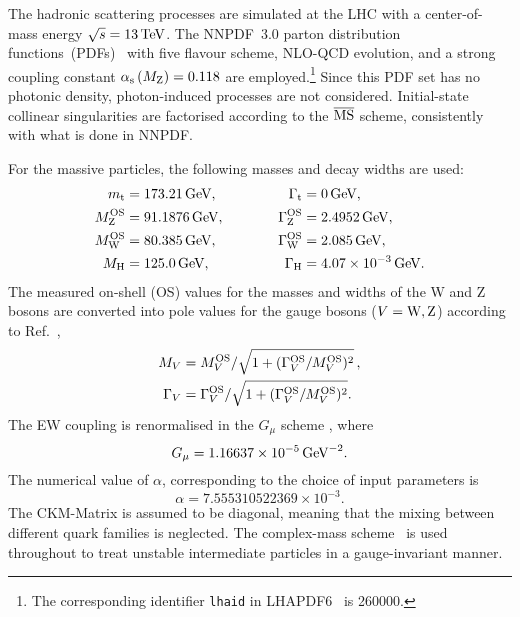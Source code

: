 The hadronic scattering processes are simulated at the LHC with a center-of-mass energy $\sqrt s = 13 \,\text{TeV}$.
The NNPDF~3.0 parton distribution functions~(PDFs)~\cite{Ball:2014uwa} with five flavour scheme, NLO-QCD evolution, and a strong coupling constant $\alpha_\text{s}\left( M_\text{Z} \right) = 0.118$ are employed.\footnote{The corresponding identifier {\tt lhaid} in LHAPDF6~\cite{Buckley:2014ana} is 260000.}
Since this PDF set has no photonic density, photon-induced processes are not considered.  
Initial-state collinear singularities are factorised according to the ${\overline{\rm MS}}$ scheme, consistently with what is done in NNPDF. 

For the massive particles, the following masses and decay widths are used:
%
\begin{alignat}{2}
                  m_\text{t}   &=  173.21\,\text{GeV},       & \quad \quad \quad \Gamma_\text{t} &= 0 \,\text{GeV},  \nonumber \\
                M_\text{Z}^\text{OS} &=  91.1876\,\text{GeV},      & \quad \quad \quad \Gamma_\text{Z}^\text{OS} &= 2.4952\,\text{GeV},  \nonumber \\
                M_\text{W}^\text{OS} &=  80.385\,\text{GeV},       & \Gamma_\text{W}^\text{OS} &= 2.085\,\text{GeV},  \nonumber \\
                M_{\rm H} &=  125.0\,\text{GeV},       &  \Gamma_\text{H}   &=  4.07 \times 10^{-3}\,\text{GeV}.
\end{alignat}
%
The measured on-shell (OS) values for the masses and widths of the W and Z bosons are converted into pole values for the gauge bosons ($V=\text{W},\text{Z}$) according to Ref.~\cite{Bardin:1988xt},
%
\begin{equation}
\begin{split}
        M_V &= M_{V}^\text{OS}/\sqrt{1+(\Gamma_{V}^\text{OS}/M_{V}^\text{OS})^2}\,, \\
   \Gamma_V &= \Gamma_{V}^\text{OS}/\sqrt{1+(\Gamma_{V}^\text{OS}/M_{V}^\text{OS})^2}.
\end{split}
\end{equation}
%
The EW coupling is renormalised in the $G_\mu$ scheme \cite{Denner:2000bj}, where
%
\begin{equation}
    G_{\mu}    = 1.16637\times 10^{-5}\,\text{GeV}^{-2}.
\end{equation}
%
The numerical value of $\alpha$, corresponding to the choice of input parameters is
%
\begin{equation}
 \alpha = 7.555310522369 \times 10^{-3}.
\end{equation}
The CKM-Matrix is assumed to be diagonal, meaning that the mixing between different quark families is neglected.
The complex-mass scheme~\cite{Denner:1999gp,Denner:2005fg,Denner:2006ic} is used throughout to treat unstable intermediate particles in a gauge-invariant manner.

